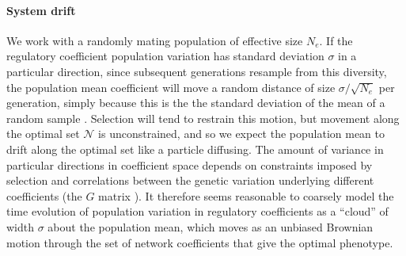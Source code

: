 \documentclass{article}
\newcommand{\1}{\mathbbm{1}}
\newcommand{\allS}{\mathcal{N}}
\begin{document}
\paragraph{System drift}
We work with a randomly mating population of effective size $N_e$. 
If the regulatory coefficient population variation
has standard deviation $\sigma$ in a particular direction,
since subsequent generations resample from this diversity,
the population mean coefficient will move a random distance of size $\sigma/\sqrt{N_e}$ per generation,
simply because this is the the standard deviation of the mean of a random sample \citep{lande_drift}.
Selection will tend to restrain this motion,
but movement along the optimal set $\allS$ is unconstrained,
and so we expect the population mean to drift along the optimal set like a particle diffusing.
The amount of variance in particular directions in coefficient space 
depends on constraints imposed by selection and 
correlations between the genetic variation underlying different coefficients (the $G$ matrix \citep{G_matrix}).
It therefore seems reasonable to coarsely model the time evolution of population variation in regulatory coefficients as 
a ``cloud'' of width $\sigma$ about the population mean, 
which moves as an unbiased Brownian motion through the set of network coefficients that give the optimal phenotype.

\end{document}
